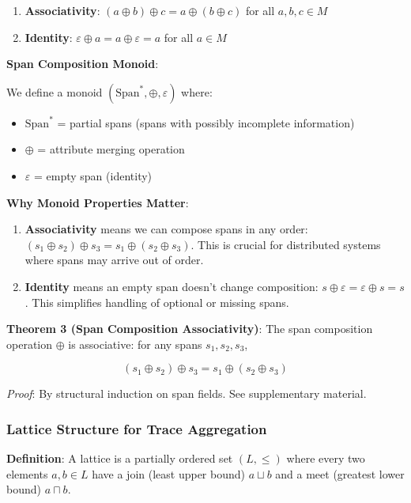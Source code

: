 \begin{enumerate}
\item \textbf{Associativity}: $(a \oplus b) \oplus c = a \oplus (b \oplus c)$ for all $a, b, c \in M$
\item \textbf{Identity}: $\varepsilon \oplus a = a \oplus \varepsilon = a$ for all $a \in M$
\end{enumerate}

\textbf{Span Composition Monoid}:

We define a monoid $(\text{Span}^*, \oplus, \varepsilon)$ where:

\begin{itemize}
\item $\text{Span}^*$ = partial spans (spans with possibly incomplete information)
\item $\oplus$ = attribute merging operation
\item $\varepsilon$ = empty span (identity)
\end{itemize}

\textbf{Why Monoid Properties Matter}:

\begin{enumerate}
\item \textbf{Associativity} means we can compose spans in any order: $(s_1 \oplus s_2) \oplus s_3 = s_1 \oplus (s_2 \oplus s_3)$. This is crucial for distributed systems where spans may arrive out of order.

\item \textbf{Identity} means an empty span doesn't change composition: $s \oplus \varepsilon = \varepsilon \oplus s = s$. This simplifies handling of optional or missing spans.
\end{enumerate}

\textbf{Theorem 3 (Span Composition Associativity)}:
The span composition operation $\oplus$ is associative: for any spans $s_1, s_2, s_3$,

\[
(s_1 \oplus s_2) \oplus s_3 = s_1 \oplus (s_2 \oplus s_3)
\]

\emph{Proof}: By structural induction on span fields. See supplementary material.

\subsubsection{Lattice Structure for Trace Aggregation}

\textbf{Definition}: A lattice is a partially ordered set $(L, \leq)$ where every two elements $a, b \in L$ have a join (least upper bound) $a \sqcup b$ and a meet (greatest lower bound) $a \sqcap b$.

